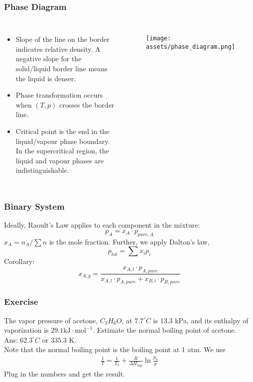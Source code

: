 \documentclass[aspectratio=169]{beamer}
\def\blankline{\\[6pt]}
\begin{document}
\begin{frame}
  \frametitle{Phase Diagram}
  \begin{columns}
    \begin{itemize}
      \item Slope of the line on the border indicates relative density. A negative slope for the solid/liquid border line means the liquid is denser.
      \item Phase transformation occurs when $(T, p)$ crosses the border line.
      \item Critical point is the end in the liquid/vapour phase boundary. In the supercritical region, the liquid and vapour phases are indistinguishable.
    \end{itemize}
    \begin{figure}
      \centering
      \texttt{[image: assets/phase\_diagram.png]}
    \end{figure}
  \end{columns}
\end{frame}
\begin{frame}
  \frametitle{Binary System}
  Ideally, Raoult's Law applies to each component in the mixture:
  \begin{equation*}
    p_A = x_A \cdot p_{pure,A}
  \end{equation*}
  $x_A = n_A/\sum n$ is the mole fraction. Further, we apply Dalton's law, 
  \begin{equation*}
    p_{tot} = \sum x_i p_i
  \end{equation*}
  Corollary:
  \begin{equation*}
    x_{A, g} = \frac{x_{A, l}\cdot p_{A, pure}}{x_{A, l}\cdot p_{A, pure}+x_{B, l}\cdot p_{B, pure}}
  \end{equation*}
\end{frame}
\begin{frame}
  \frametitle{Exercise}
  The vapor pressure of acetone, $C_3H_6O$, at $7.7^{\circ}C$ is 13.3 kPa, and its enthalpy of vaporization is $29.1 \mathrm{kJ}\cdot \mathrm{mol}^{-1}$. 
  Estimate the normal boiling point of acetone.
  \pause
  \blankline
  Ans: $62.3^{\circ}C$ or $335.3$ K.
  \blankline
  Note that the normal boiling point is the boiling point at 1 atm. We use
  \begin{align*}
    \frac{1}{T} = \frac{1}{T_0} + \frac{R}{\Delta H_{vap}^{\circ}}\ln \frac{p_0}{p}
  \end{align*}
  Plug in the numbers and get the result.
\end{frame}
\end{document}
